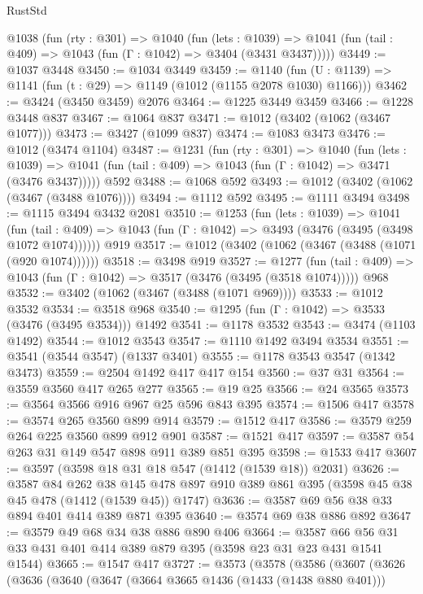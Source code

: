 \begin{lexlean}{RustStd}
\begin{coremodule}
  @1038
    (fun (rty : @301) =>
    @1040
      (fun (lets : @1039) =>
      @1041 (fun (tail : @409) => @1043 (fun (Γ : @1042) => @3404 (@3431 @3437)))))
@3449 := @1037 @3448
@3450 := @1034 @3449
@3459 := @1140 (fun (U : @1139) => @1141 (fun (t : @29) => @1149 (@1012 (@1155 @2078 @1030) @1166)))
@3462 := @3424 (@3450 @3459) @2076
@3464 := @1225 @3449 @3459
@3466 := @1228 @3448 @837
@3467 := @1064 @837
@3471 := @1012 (@3402 (@1062 (@3467 @1077)))
@3473 := @3427 (@1099 @837)
@3474 := @1083 @3473
@3476 := @1012 (@3474 @1104)
@3487 := @1231
    (fun (rty : @301) =>
    @1040
      (fun (lets : @1039) =>
      @1041 (fun (tail : @409) => @1043 (fun (Γ : @1042) => @3471 (@3476 @3437)))))
    @592
@3488 := @1068 @592
@3493 := @1012 (@3402 (@1062 (@3467 (@3488 @1076))))
@3494 := @1112 @592
@3495 := @1111 @3494
@3498 := @1115 @3494 @3432 @2081
@3510 := @1253
    (fun (lets : @1039) =>
    @1041
      (fun (tail : @409) => @1043 (fun (Γ : @1042) => @3493 (@3476 (@3495 (@3498 @1072 @1074))))))
    @919
@3517 := @1012 (@3402 (@1062 (@3467 (@3488 (@1071 (@920 @1074))))))
@3518 := @3498 @919
@3527 := @1277
    (fun (tail : @409) => @1043 (fun (Γ : @1042) => @3517 (@3476 (@3495 (@3518 @1074)))))
    @968
@3532 := @3402 (@1062 (@3467 (@3488 (@1071 @969))))
@3533 := @1012 @3532
@3534 := @3518 @968
@3540 := @1295 (fun (Γ : @1042) => @3533 (@3476 (@3495 @3534))) @1492
@3541 := @1178 @3532
@3543 := @3474 (@1103 @1492)
@3544 := @1012 @3543
@3547 := @1110 @1492 @3494 @3534
@3551 := @3541 (@3544 @3547) (@1337 @3401)
@3555 := @1178 @3543 @3547 (@1342 @3473)
@3559 := @2504 @1492 @417 @417 @154
@3560 := @37 @31
@3564 := @3559 @3560 @417 @265 @277
@3565 := @19 @25
@3566 := @24 @3565
@3573 := @3564 @3566 @916 @967 @25 @596 @843 @395
@3574 := @1506 @417
@3578 := @3574 @265 @3560 @899 @914
@3579 := @1512 @417
@3586 := @3579 @259 @264 @225 @3560 @899 @912 @901
@3587 := @1521 @417
@3597 := @3587 @54 @263 @31 @149 @547 @898 @911 @389 @851 @395
@3598 := @1533 @417
@3607 := @3597 (@3598 @18 @31 @18 @547 (@1412 (@1539 @18)) @2031)
@3626 := @3587
    @84
    @262
    @38
    @145
    @478
    @897
    @910
    @389
    @861
    @395
    (@3598 @45 @38 @45 @478 (@1412 (@1539 @45)) @1747)
@3636 := @3587 @69 @56 @38 @33 @894 @401 @414 @389 @871 @395
@3640 := @3574 @69 @38 @886 @892
@3647 := @3579 @49 @68 @34 @38 @886 @890 @406
@3664 := @3587 @66 @56 @31 @33 @431 @401 @414 @389 @879 @395 (@3598 @23 @31 @23 @431 @1541 @1544)
@3665 := @1547 @417
@3727 := @3573
    (@3578
      (@3586
        (@3607
          (@3626
            (@3636
              (@3640
                (@3647
                  (@3664 @3665 @1436 (@1433 (@1438 @880 @401)))

\end{coremodule}
\end{lexlean}

